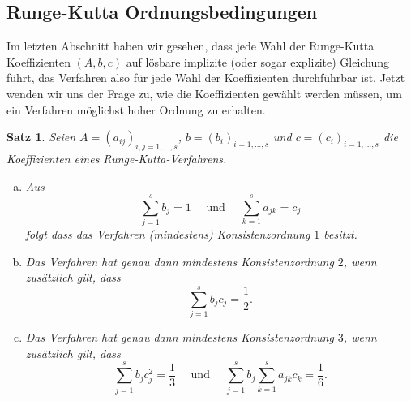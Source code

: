 \documentclass[12pt,a4paper]{book}
\theoremstyle{break}
\newtheorem{theorem}{Satz}[chapter]
\theoremstyle{nonumberplain}
\newcommand{\1}{\mathbbm{1}} 			      	%
\begin{document}
\subsection{Runge-Kutta Ordnungsbedingungen}

Im letzten Abschnitt haben wir gesehen, dass jede Wahl der Runge-Kutta Koeffizienten $(A,b,c)$ auf 
lösbare implizite (oder sogar explizite) Gleichung führt, das Verfahren also für jede Wahl der Koeffizienten durchführbar ist.
Jetzt wenden wir uns der Frage zu, wie die Koeffizienten gewählt werden müssen, um ein Verfahren möglichst hoher Ordnung zu erhalten.


\begin{theorem}\label{thm:RungeKuttaOrderCond}
Seien $A=(a_{ij})_{i,j=1,\ldots,s}$, $b=(b_i)_{i=1,\ldots,s}$ und $c=(c_i)_{i=1,\ldots,s}$ die Koeffizienten eines Runge-Kutta-Verfahrens.
%
\begin{enumerate}[(a)]
\item Aus
\[
\sum_{j=1}^s b_j=1 \quad \mbox{ und } \quad \sum_{k=1}^s a_{jk}=c_j  
\]
folgt dass das Verfahren (mindestens) Konsistenzordnung $1$ besitzt.
\item Das Verfahren hat genau dann mindestens Konsistenzordnung $2$, wenn
zusätzlich gilt, dass
\[
\sum_{j=1}^s b_jc_j=\frac{1}{2}.
\]
\item Das Verfahren hat genau dann mindestens Konsistenzordnung $3$, wenn
zusätzlich gilt, dass
\[
\sum_{j=1}^s b_j c_j^2 = \frac{1}{3}  \quad \mbox{ und } \quad  
\sum_{j=1}^s b_j \sum_{k=1}^s a_{jk} c_k = \frac{1}{6}.
\]
\end{enumerate}
\end{theorem}
\end{document}
